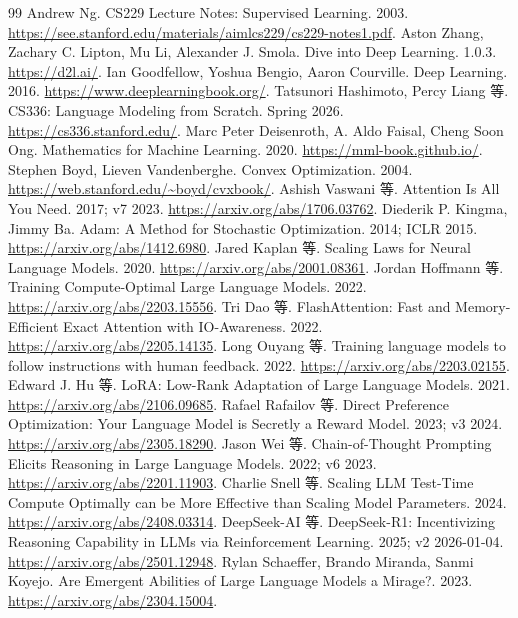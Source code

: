 \begin{thebibliography}{99}
 Andrew Ng. CS229 Lecture Notes: Supervised Learning. 2003. \url{https://see.stanford.edu/materials/aimlcs229/cs229-notes1.pdf}.
 Aston Zhang, Zachary C. Lipton, Mu Li, Alexander J. Smola. Dive into Deep Learning. 1.0.3. \url{https://d2l.ai/}.
 Ian Goodfellow, Yoshua Bengio, Aaron Courville. Deep Learning. 2016. \url{https://www.deeplearningbook.org/}.
 Tatsunori Hashimoto, Percy Liang 等. CS336: Language Modeling from Scratch. Spring 2026. \url{https://cs336.stanford.edu/}.
 Marc Peter Deisenroth, A. Aldo Faisal, Cheng Soon Ong. Mathematics for Machine Learning. 2020. \url{https://mml-book.github.io/}.
 Stephen Boyd, Lieven Vandenberghe. Convex Optimization. 2004. \url{https://web.stanford.edu/~boyd/cvxbook/}.
 Ashish Vaswani 等. Attention Is All You Need. 2017; v7 2023. \url{https://arxiv.org/abs/1706.03762}.
 Diederik P. Kingma, Jimmy Ba. Adam: A Method for Stochastic Optimization. 2014; ICLR 2015. \url{https://arxiv.org/abs/1412.6980}.
 Jared Kaplan 等. Scaling Laws for Neural Language Models. 2020. \url{https://arxiv.org/abs/2001.08361}.
 Jordan Hoffmann 等. Training Compute-Optimal Large Language Models. 2022. \url{https://arxiv.org/abs/2203.15556}.
 Tri Dao 等. FlashAttention: Fast and Memory-Efficient Exact Attention with IO-Awareness. 2022. \url{https://arxiv.org/abs/2205.14135}.
 Long Ouyang 等. Training language models to follow instructions with human feedback. 2022. \url{https://arxiv.org/abs/2203.02155}.
 Edward J. Hu 等. LoRA: Low-Rank Adaptation of Large Language Models. 2021. \url{https://arxiv.org/abs/2106.09685}.
 Rafael Rafailov 等. Direct Preference Optimization: Your Language Model is Secretly a Reward Model. 2023; v3 2024. \url{https://arxiv.org/abs/2305.18290}.
 Jason Wei 等. Chain-of-Thought Prompting Elicits Reasoning in Large Language Models. 2022; v6 2023. \url{https://arxiv.org/abs/2201.11903}.
 Charlie Snell 等. Scaling LLM Test-Time Compute Optimally can be More Effective than Scaling Model Parameters. 2024. \url{https://arxiv.org/abs/2408.03314}.
 DeepSeek-AI 等. DeepSeek-R1: Incentivizing Reasoning Capability in LLMs via Reinforcement Learning. 2025; v2 2026-01-04. \url{https://arxiv.org/abs/2501.12948}.
 Rylan Schaeffer, Brando Miranda, Sanmi Koyejo. Are Emergent Abilities of Large Language Models a Mirage?. 2023. \url{https://arxiv.org/abs/2304.15004}.

\end{thebibliography}
